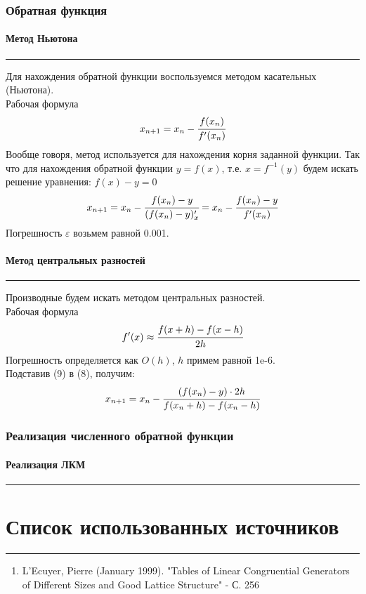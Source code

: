 \documentclass[a4paper, 14pt]{extarticle}
\begin{document}
\subsubsection{Обратная функция}

\paragraph{Метод Ньютона}\vspace{-20pt}\rule{\linewidth}{0.1mm}

Для нахождения обратной функции воспользуемся методом касательных (Ньютона). \\
Рабочая формула
\begin{equation*}
  x_{n+1} = x_n - \cfrac{f(x_n)}{f'(x_n)}
\end{equation*}
Вообще говоря, метод используется для нахождения корня заданной функции. Так что 
для нахождения обратной функции $y = f(x)$, т.е. $x = f^{-1}(y)$ будем искать 
решение уравнения: $f(x) - y = 0$
\begin{equation}
  x_{n+1} = x_n - \cfrac{f(x_n) - y}{(f(x_n) - y)'_x} = 
  x_n - \cfrac{f(x_n) - y}{f'(x_n)}
\end{equation}
Погрешность $\varepsilon$ возьмем равной 0.001.

\paragraph{Метод центральных разностей}\vspace{-20pt}\rule{\linewidth}{0.1mm}

Производные будем искать методом центральных разностей.\\
Рабочая формула
\begin{equation}
  f'(x) \approx \cfrac{f(x+h) - f(x-h)}{2h}
\end{equation}
Погрешность определяется как $O(h)$, $h$ примем равной 1e-6.\\

Подставив (9) в (8), получим:
\begin{equation}
  x_{n+1} = x_n - \cfrac{(f(x_n) - y) \cdot 2 h}{f(x_n + h) - f(x_n - h)}
\end{equation}

\subsubsection{Реализация численного обратной функции}

\paragraph{Реализация ЛКМ}\vspace{-20pt}\rule{\linewidth}{0.1mm}

\newpage
\section{Список использованных источников}\vspace{-20pt}\rule{\linewidth}{0.1mm}
\begin{enumerate}
  \item \label{item:source1} L'Ecuyer, Pierre (January 1999). "Tables of Linear Congruential Generators of Different Sizes and Good Lattice Structure" - С. 256
\end{enumerate}
\end{document}
